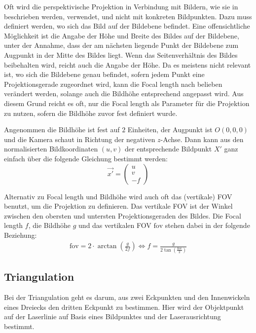 \documentclass[ngerman,a4paper,parskip=half]{scrartcl}
\def \fov{\mathrm{fov}}
\begin{document}
Oft wird die perspektivische Projektion in Verbindung mit Bildern, wie sie in  beschrieben werden, verwendet, und nicht mit konkreten Bildpunkten. Dazu muss definiert werden, wo sich das Bild auf der Bildebene befindet. Eine offensichtliche Möglichkeit ist die Angabe der Höhe und Breite des Bildes auf der Bildebene, unter der Annahme, dass der am nächsten liegende Punkt der Bildebene zum Augpunkt in der Mitte des Bildes liegt. Wenn das Seitenverhältnis des Bildes beibehalten wird, reicht auch die Angabe der Höhe. Da es meistens nicht relevant ist, wo sich die Bildebene genau befindet, sofern jedem Punkt eine Projektionsgerade zugeordnet wird, kann die Focal length nach belieben verändert werden, solange auch die Bildhöhe entsprechend angepasst wird. Aus diesem Grund reicht es oft, nur die Focal length als Parameter für die Projektion zu nutzen, sofern die Bildhöhe zuvor fest definiert wurde.

Angenommen die Bildhöhe ist fest auf $2$ Einheiten, der Augpunkt ist $O(0,0,0)$ und die Kamera schaut in Richtung der negativen $z$-Achse. Dann kann aus den normalisierten Bildkoordinaten $(u,v)$ der entsprechende Bildpunkt $X'$ ganz einfach über die folgende Gleichung bestimmt werden:
\[ \vec{x'} = \begin{pmatrix}
u \\ v \\ -f
\end{pmatrix} \]

Alternativ zu Focal length und Bildhöhe wird auch oft das (vertikale) \ac{FOV} benutzt, um die Projektion zu definieren. Das vertikale \ac{FOV} ist der Winkel zwischen den obersten und untersten Projektionsgeraden des Bildes. Die Focal length $f$, die Bildhöhe $g$ und das vertikalen \ac{FOV} $\fov$ stehen dabei in der folgende Beziehung:
\begin{align*}
	\fov = 2 \cdot \arctan \left( \frac{g}{2 f} \right)
	\Leftrightarrow f = \frac{g}{2 \tan\left(\frac{\fov}{2}\right)}
\end{align*}

\subsection{Triangulation}

Bei der Triangulation geht es darum, aus zwei Eckpunkten und den Innenwickeln eines Dreiecks den dritten Eckpunkt zu bestimmen. Hier wird der Objektpunkt auf der Laserlinie auf Basis eines Bildpunktes und der Laserausrichtung bestimmt.
\end{document}

